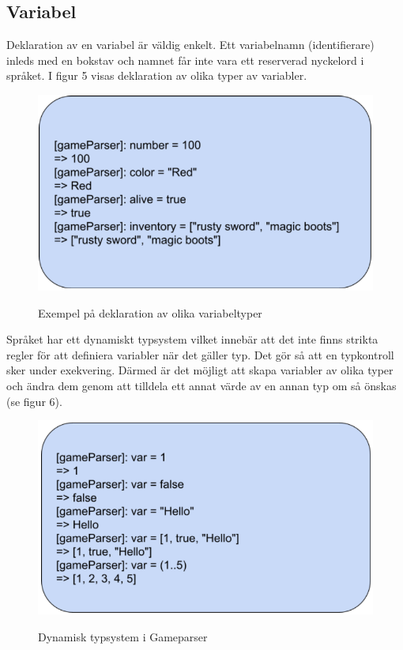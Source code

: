 \documentclass{Dokumentmall}
\begin{document}
\subsection{Variabel}
Deklaration av en variabel är väldig enkelt. Ett variabelnamn (identifierare) inleds med en bokstav och namnet får inte vara ett reserverad nyckelord i språket. I figur 5 visas deklaration av olika typer av variabler.

\newpage
\begin{figure}[h!]
  \centering
  \includegraphics[scale = 0.65]{Images/Figur5.png}
  \label{}
  \caption{Exempel på deklaration av olika variabeltyper}
\end{figure}

Språket har ett dynamiskt typsystem vilket innebär att det inte finns strikta regler för att definiera variabler när det gäller typ. Det gör så att en typkontroll sker under exekvering. Därmed är det möjligt att skapa variabler av olika typer och ändra dem genom att tilldela ett annat värde av en annan typ om så önskas (se figur 6).

\begin{figure}[h!]
  \centering
  \includegraphics[scale = 0.65]{Images/Figur6.png}
  \label{}
  \caption{Dynamisk typsystem i Gameparser}
\end{figure}
\end{document}
